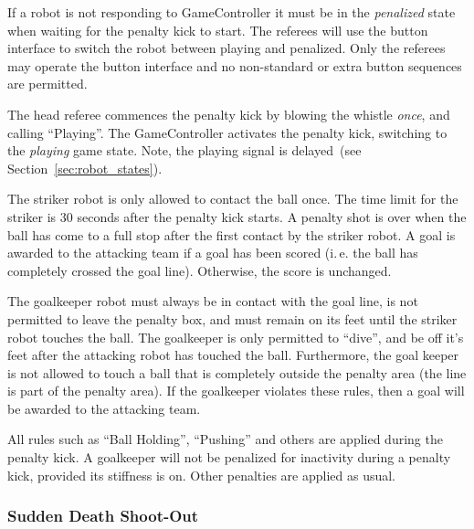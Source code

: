 \documentclass[12pt]{article}
\newcommand{\ie}{\mbox{i.\,e.}\xspace}
\newcommand{\eg}{\mbox{e.\,g.}\xspace}
\newcommand{\cf}{see\xspace}
\newcommand{\PenaltyKickTime}{30 seconds\xspace}
\begin{document}
If a robot is not responding to GameController it must be in the \emph{penalized} state when waiting for the penalty kick to start.
The referees will use the button interface to switch the robot between playing and penalized.
Only the referees may operate the button interface and no non-standard or extra button sequences are permitted.

The head referee commences the penalty kick by blowing the whistle \textit{once}, and calling ``Playing''.
The GameController activates the penalty kick, switching to the \emph{playing} game state.
Note, the playing signal is delayed~(\cf Section~\ref{sec:robot_states}).

The striker robot is only allowed to contact the ball once.
The time limit for the striker is \PenaltyKickTime after the penalty kick starts.
A penalty shot is over when the ball has come to a full stop after the first contact by the striker robot.
A goal is awarded to the attacking team if a goal has been scored (\ie the ball has completely crossed the goal line).
Otherwise, the score is unchanged.

The goalkeeper robot must always be in contact with the goal line, is not permitted to leave the penalty box, and must remain on its feet until the striker robot touches the ball.
The goalkeeper is only permitted to ``dive'', and be off it's feet after the attacking robot has touched the ball.
Furthermore, the goal keeper is not allowed to touch a ball that is completely outside the penalty area (the line is part of the penalty area).
If the goalkeeper violates these rules, then a goal will be awarded to the attacking team.

All rules such as ``Ball Holding'', ``Pushing'' and others are applied during the penalty kick.
A goalkeeper will not be penalized for inactivity during a penalty kick, provided its stiffness is on.
Other penalties are applied as usual.

\subsubsection{Sudden Death Shoot-Out}
\label{sec:sudden_death_shoot_out}
\end{document}
